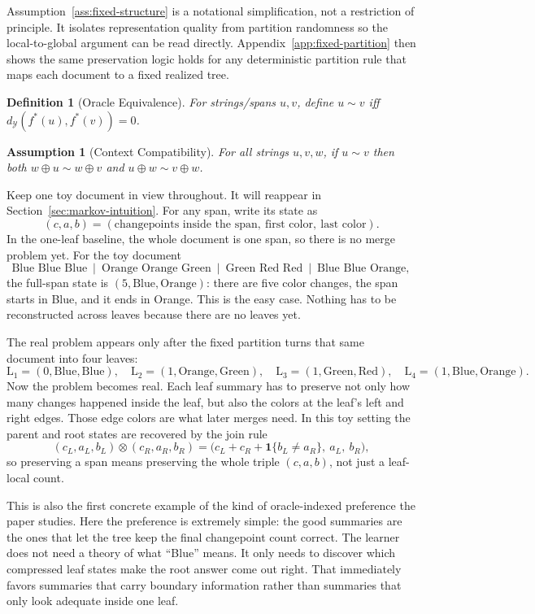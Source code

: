\documentclass[11pt]{article}
\newtheorem{definition}{Definition}
\newtheorem{assumption}{Assumption}
\newcommand{\Y}{\mathcal{Y}}
\newcommand{\metric}{d_{\Y}}
\newcommand{\fstar}{f^\ast}
\newcommand{\concat}{\oplus}
\begin{document}
Assumption~\ref{ass:fixed-structure} is a notational simplification, not a restriction of principle. It isolates representation quality from partition randomness so the local-to-global argument can be read directly. Appendix~\ref{app:fixed-partition} then shows the same preservation logic holds for any deterministic partition rule that maps each document to a fixed realized tree.

\begin{definition}[Oracle Equivalence]
For strings/spans $u,v$, define $u\sim v$ iff $\metric(\fstar(u),\fstar(v))=0$.
\end{definition}

\begin{assumption}[Context Compatibility]\label{ass:context-compat}
For all strings $u,v,w$, if $u\sim v$ then both $w\concat u\sim w\concat v$ and $u\concat w\sim v\concat w$.
\end{assumption}

Keep one toy document in view throughout. It will reappear in Section~\ref{sec:markov-intuition}. For any span, write its state as
\[
(c,a,b)= (\text{changepoints inside the span},\ \text{first color},\ \text{last color}).
\]
In the one-leaf baseline, the whole document is one span, so there is no merge problem yet. For the toy document
\[
\text{Blue Blue Blue}\ \mid\ \text{Orange Orange Green}\ \mid\ \text{Green Red Red}\ \mid\ \text{Blue Blue Orange},
\]
the full-span state is $(5,\text{Blue},\text{Orange})$: there are five color changes, the span starts in Blue, and it ends in Orange. This is the easy case. Nothing has to be reconstructed across leaves because there are no leaves yet.

The real problem appears only after the fixed partition turns that same document into four leaves:
\[
\mathrm{L}_1=(0,\text{Blue},\text{Blue}),\quad
\mathrm{L}_2=(1,\text{Orange},\text{Green}),\quad
\mathrm{L}_3=(1,\text{Green},\text{Red}),\quad
\mathrm{L}_4=(1,\text{Blue},\text{Orange}).
\]
Now the problem becomes real. Each leaf summary has to preserve not only how many changes happened inside the leaf, but also the colors at the leaf's left and right edges. Those edge colors are what later merges need. In this toy setting the parent and root states are recovered by the join rule
\[
(c_L,a_L,b_L)\otimes(c_R,a_R,b_R)
=
\big(c_L+c_R+\mathbf{1}\{b_L\neq a_R\},\ a_L,\ b_R\big),
\]
so preserving a span means preserving the whole triple $(c,a,b)$, not just a leaf-local count.

This is also the first concrete example of the kind of oracle-indexed preference the paper studies. Here the preference is extremely simple: the good summaries are the ones that let the tree keep the final changepoint count correct. The learner does not need a theory of what ``Blue'' means. It only needs to discover which compressed leaf states make the root answer come out right. That immediately favors summaries that carry boundary information rather than summaries that only look adequate inside one leaf.
\end{document}
